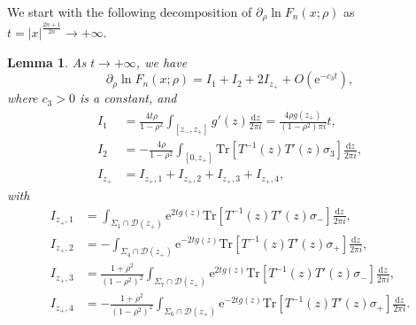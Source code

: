 \documentclass[11pt,a4paper]{article}
\newtheorem{lemma}[thm]{Lemma}
\numberwithin{equation}{section}
\begin{document}
We start with the following decomposition of $\partial_{\rho}\ln F_n(x;\rho)$ as $t=|x|^{\frac {2n+1}{2n}}\to+\infty$.
\begin{lemma}\label{Fred-estimate}
As $t\to+\infty$, we have
\begin{equation}\label{eq:dFI}
\partial_{\rho}\ln F_n(x;\rho)=I_1+I_2+2I_{z_+}+O\left(\mathrm{e}^{-c_3t}\right),
\end{equation}
where $c_3>0$ is a constant, and
\begin{align}\label{I-1}
I_1&=\frac{4t\rho}{1-\rho^2}\int_{[z_-,z_+]}g'(z)\frac{\mathrm{d}z}{2\pi i}
=\frac{4\rho{g}(z_+)}{(1-\rho^2)\pi{i}}t,\\
I_2&=-\frac{4\rho}{1-\rho^2}\int_{[0,z_+]}\mathrm{Tr}
\left[T^{-1}(z)T'(z)\sigma_3\right]\frac{\mathrm{d}z}{2\pi i},\label{I-2}\\
I_{z_+}&=I_{z_+,1}+I_{z_+,2}+I_{z_+,3}+I_{z_+,4}, \label{I-z+}
\end{align}
with
\begin{align}
I_{z_+,1}&=\int_{\Sigma_1\cap \mathcal{D}(z_+)}\mathrm{e}^{2tg(z)}
\mathrm{Tr}\left[T^{-1}(z)T'(z)\sigma_-\right]\frac{\mathrm{d}z}{2\pi i}, \label{eq:z+1}\\
I_{z_+,2}&= -\int_{\Sigma_4\cap \mathcal{D}(z_+)}\mathrm{e}^{-2tg(z)}
\mathrm{Tr}\left[T^{-1}(z)T'(z)\sigma_+\right]\frac{\mathrm{d}z}{2\pi i},\label{eq:z+2}\\
I_{z_+,3}&=\frac{1+\rho^2}{(1-\rho^2)^2}
\int_{\Sigma_7\cap \mathcal{D}(z_+)}\mathrm{e}^{2tg(z)}
\mathrm{Tr}\left[T^{-1}(z)T'(z)\sigma_-\right]\frac{\mathrm{d}z}{2\pi i},\label{eq:z+3}\\
I_{z_+,4}&=-\frac{1+\rho^2}{(1-\rho^2)^2}
\int_{\Sigma_6\cap \mathcal{D}(z_+)}\mathrm{e}^{-2tg(z)}
\mathrm{Tr}\left[T^{-1}(z)T'(z)\sigma_+\right]\frac{\mathrm{d}z}{2\pi i}.\label{eq:z+4}
\end{align}
\end{lemma}
\end{document}

